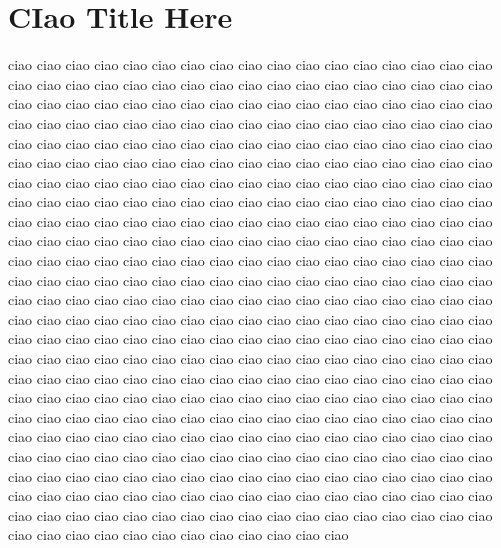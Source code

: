 

\chapter{CIao Title Here} %

\label{ChapterX} %


ciao ciao ciao ciao ciao ciao ciao ciao ciao ciao ciao ciao ciao ciao ciao ciao ciao ciao ciao ciao ciao ciao ciao ciao ciao ciao ciao ciao 
ciao ciao ciao ciao ciao ciao ciao ciao ciao ciao ciao ciao ciao ciao ciao ciao ciao ciao ciao ciao ciao ciao ciao ciao ciao ciao ciao ciao 
ciao ciao ciao ciao ciao ciao ciao ciao ciao ciao ciao ciao ciao ciao ciao ciao ciao ciao ciao ciao ciao ciao ciao ciao ciao ciao ciao ciao 
ciao ciao ciao ciao ciao ciao ciao ciao ciao ciao ciao ciao ciao ciao ciao ciao ciao ciao ciao ciao ciao ciao ciao ciao ciao ciao ciao ciao 
ciao ciao ciao ciao ciao ciao ciao ciao ciao ciao ciao ciao ciao ciao ciao ciao ciao ciao ciao ciao ciao ciao ciao ciao ciao ciao ciao ciao 
ciao ciao ciao ciao ciao ciao ciao ciao ciao ciao ciao ciao ciao ciao ciao ciao ciao ciao ciao ciao ciao ciao ciao ciao ciao ciao ciao ciao 
ciao ciao ciao ciao ciao ciao ciao ciao ciao ciao ciao ciao ciao ciao ciao ciao ciao ciao ciao ciao ciao ciao ciao ciao ciao ciao ciao ciao 
ciao ciao ciao ciao ciao ciao ciao ciao ciao ciao ciao ciao ciao ciao ciao ciao ciao ciao ciao ciao ciao ciao ciao ciao ciao ciao ciao ciao 
ciao ciao ciao ciao ciao ciao ciao ciao ciao ciao ciao ciao ciao ciao ciao ciao ciao ciao ciao ciao ciao ciao ciao ciao ciao ciao ciao ciao 
ciao ciao ciao ciao ciao ciao ciao ciao ciao ciao ciao ciao ciao ciao ciao ciao ciao ciao ciao ciao ciao ciao ciao ciao ciao ciao ciao ciao 
ciao ciao ciao ciao ciao ciao ciao ciao ciao ciao ciao ciao ciao ciao ciao ciao ciao ciao ciao ciao ciao ciao ciao ciao ciao ciao ciao ciao 
ciao ciao ciao ciao ciao ciao ciao ciao ciao ciao ciao ciao ciao ciao ciao ciao ciao ciao ciao ciao ciao ciao ciao ciao ciao ciao ciao ciao 
ciao ciao ciao ciao ciao ciao ciao ciao ciao ciao ciao ciao ciao ciao ciao ciao ciao ciao ciao ciao ciao ciao ciao ciao ciao ciao ciao ciao 
ciao ciao ciao ciao ciao ciao ciao ciao ciao ciao ciao ciao ciao ciao ciao ciao ciao ciao ciao ciao ciao ciao ciao ciao ciao ciao ciao ciao 
ciao ciao ciao ciao ciao ciao ciao ciao ciao ciao ciao ciao ciao ciao ciao ciao ciao ciao ciao ciao ciao ciao ciao ciao ciao ciao ciao ciao 
